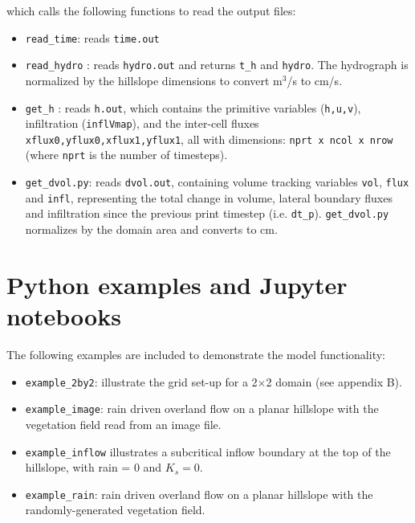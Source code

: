 \documentclass{article}
\newcommand{\code}[1]{\texttt{#1}}
\begin{document}
which calls the following functions to read the output files:
\begin{itemize}
	\item \code{read\_time}: reads \code{time.out}
	\item \code{read\_hydro} : reads \code{hydro.out} and returns \code{t\_h} and \code{hydro}. The hydrograph is normalized by the hillslope dimensions to convert m$^3$/s to cm/s.
	\item \code{get\_h} : reads \code{h.out}, which contains the primitive variables (\code{h,u,v}), infiltration  (\code{inflVmap}), and the inter-cell fluxes \code{xflux0,yflux0,xflux1,yflux1}, all with dimensions: \code{nprt x ncol x nrow} (where \code{nprt} is the number of timesteps).
	\item \code{get\_dvol.py}: reads \code{dvol.out}, containing volume tracking variables  \code{vol},  \code{flux} and  \code{infl}, representing the total change in volume, lateral boundary fluxes and infiltration since the previous print timestep (i.e. \code{dt\_p}). \code{get\_dvol.py} normalizes by the domain area and converts to cm. 
\end{itemize}

 

	
\section{Python examples and Jupyter notebooks}	

The following examples are included to demonstrate the model functionality:
\begin{itemize}
	\item \code{example\_2by2}: illustrate the grid set-up for a 2$\times$2 domain (see appendix B).
	\item  \code{example\_image}: rain driven overland flow on a planar hillslope with the vegetation field read from an image file.
	\item \code{example\_inflow} illustrates a subcritical inflow boundary at the top of the hillslope, with rain = 0 and $K_s=0$.
	\item \code{example\_rain}:  rain driven overland flow on a planar hillslope with the randomly-generated vegetation field.
\end{itemize}
\end{document}
